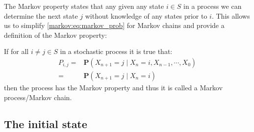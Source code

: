 The Markov property states that any given any state $i \in S$ in a process we can determine the next state $j$ without knowledge of any states prior to $i$.
This allows us to simplify \cref{markov:eq:markov_prob} for Markov chains and provide a definition of the Markov property:

If for all $i \neq j \in S$ in a stochastic process it is true that:
\begin{align}\label{markov:eq:markov_prob}
P_{i,j} = &\mathbf{P}(X_{n+1} = j \mid X_n = i, X_{n-1}, \cdots, X_0) \nonumber\\
        = &\mathbf{P}(X_{n+1} = j \mid X_n = i)
\end{align}
then the process has the Markov property and thus it is called a Markov process/Markov chain.

\subsection{The initial state}\label{markov:initialstate}